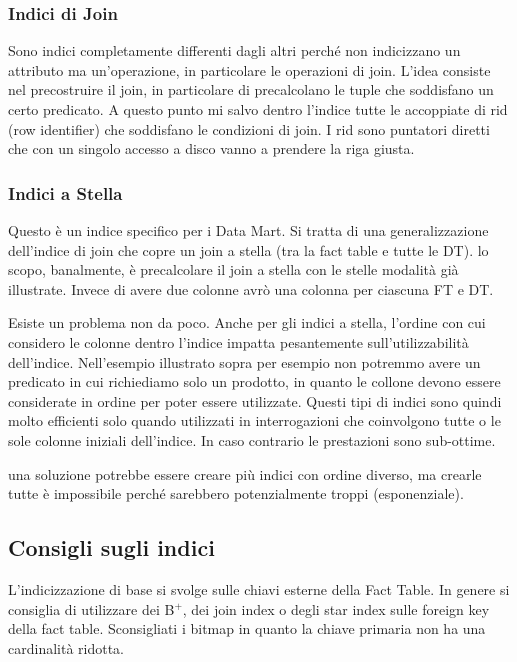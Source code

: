 \subsubsection{Indici di Join}
Sono indici completamente differenti dagli altri perché non indicizzano un attributo ma un'operazione, in particolare le operazioni di join. L'idea consiste nel precostruire il join, in particolare di precalcolano le tuple che soddisfano un certo predicato. A questo punto mi salvo dentro l'indice tutte le accoppiate di rid (row identifier) che soddisfano le condizioni di join. I rid sono puntatori diretti che con un singolo accesso a disco vanno a prendere la riga giusta.


\subsubsection{Indici a Stella}
Questo è un indice specifico per i Data Mart. Si tratta di una generalizzazione dell'indice di join che copre un join a stella (tra la fact table e tutte le DT). lo scopo, banalmente, è precalcolare il join a stella con le stelle modalità già illustrate. Invece di avere due colonne avrò una colonna per ciascuna FT e DT.

Esiste un problema non da poco. Anche per gli indici a stella, l'ordine con cui considero le colonne dentro l'indice impatta pesantemente sull'utilizzabilità dell'indice. Nell'esempio illustrato sopra per esempio non potremmo avere un predicato in cui richiediamo solo un prodotto, in quanto le collone devono essere considerate in ordine per poter essere utilizzate. Questi tipi di indici sono quindi molto efficienti solo quando utilizzati in interrogazioni che coinvolgono tutte o le sole colonne iniziali dell'indice. In caso contrario le prestazioni sono sub-ottime.

una soluzione potrebbe essere creare più indici con ordine diverso, ma crearle tutte è impossibile perché sarebbero potenzialmente troppi (esponenziale).


\subsection{Consigli sugli indici}
L'indicizzazione di base si svolge sulle chiavi esterne della Fact Table.
\noindent In genere si consiglia di utilizzare dei B$^{+}$, dei join index o degli star index sulle foreign key della fact table. Sconsigliati i bitmap in quanto la chiave primaria non ha una cardinalità ridotta.


